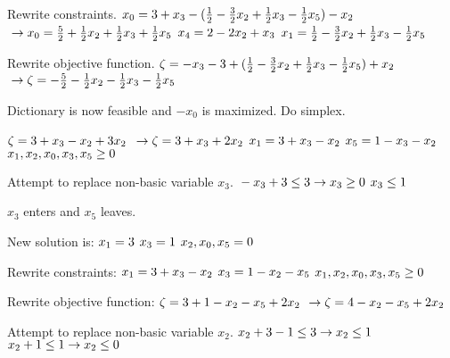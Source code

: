 \documentclass{article}
\begin{document}
Rewrite constraints.
$\\ x_0 = 3 + x_3 - (\frac{1}{2} - \frac{3}{2}x_2 + \frac{1}{2}x_3 - \frac{1}{2}x_5) - x_2$
$\\\to x_0 = \frac{5}{2} + \frac{1}{2}x_2 + \frac{1}{2}x_3 + \frac{1}{2}x_5$
$\\ x_4 = 2 - 2x_2 + x_3$
$\\ x_1 = \frac{1}{2} - \frac{3}{2}x_2 + \frac{1}{2}x_3 - \frac{1}{2}x_5$

Rewrite objective function.
$\\\zeta = -x_3 - 3 + (\frac{1}{2} - \frac{3}{2}x_2 + \frac{1}{2}x_3 - \frac{1}{2}x_5) + x_2$
$\\\to \zeta = - \frac{5}{2} - \frac{1}{2}x_2 - \frac{1}{2}x_3 - \frac{1}{2}x_5$

Dictionary is now feasible and $-x_0$ is maximized. Do simplex.

$\\\zeta = 3 + x_3 - x_2 + 3x_2$
$\\\to \zeta = 3 + x_3 + 2x_2$
$\\ x_1 = 3 + x_3 - x_2$
$\\ x_5 = 1 - x_3 - x_2$
$\\ x_1, x_2, x_0, x_3, x_5 \geq 0$

Attempt to replace non-basic variable $x_3$.
$\\-x_3 + 3 \leq 3 \to x_3 \geq 0$
$\\x_3 \leq 1$

$x_3$ enters and $x_5$ leaves.

New solution is:
$\\x_1 = 3$
$\\x_3 = 1$
$\\x_2, x_0, x_5 = 0$

Rewrite constraints:
$\\ x_1 = 3 + x_3 - x_2$
$\\ x_3 = 1 - x_2 - x_5$
$\\ x_1, x_2, x_0, x_3, x_5 \geq 0$

Rewrite objective function:
$\\\zeta = 3 + 1 - x_2 - x_5 + 2x_2$
$\\\to \zeta = 4 - x_2 - x_5 + 2x_2$

Attempt to replace non-basic variable $x_2$.
$\\ x_2 + 3 - 1 \leq 3 \to x_2 \leq 1$
$\\ x_2 + 1 \leq 1 \to x_2 \leq 0$
\end{document}
